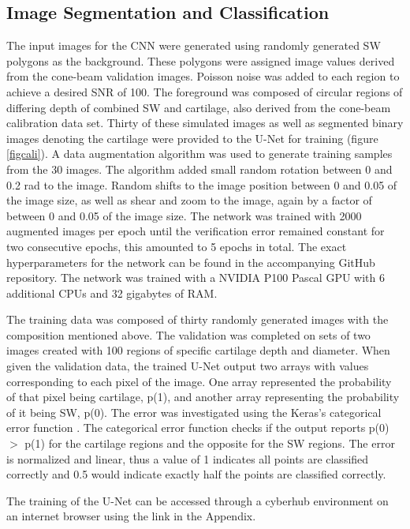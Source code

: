 \documentclass[a4paper,11pt]{article}
\begin{document}
\subsection{Image Segmentation and Classification}


The input images for the CNN were generated using randomly generated SW polygons as the background. These polygons were assigned image values derived from the cone-beam validation images. Poisson noise was added to each region to achieve a desired SNR of 100. The foreground was composed of circular regions of differing depth of combined SW and cartilage, also derived from the cone-beam calibration data set. Thirty of these simulated images as well as segmented binary images denoting the cartilage were provided to the U-Net for training (figure \ref{figcali}). A data augmentation algorithm was used to generate training samples from the 30 images. The algorithm added small random rotation between 0 and 0.2 rad to the image. Random shifts to the image position between 0 and 0.05 of the image size, as well as shear and zoom to the image, again by a factor of between 0 and 0.05 of the image size. The network was trained with 2000 augmented images per epoch until the verification error remained constant for two consecutive epochs, this amounted to 5 epochs in total. The exact hyperparameters for the network can be found in the accompanying GitHub repository. The network was trained with a NVIDIA P100 Pascal GPU \cite{Lindholm2008NVIDIAArchitecture} with 6 additional CPUs and 32 gigabytes of RAM.

The training data was composed of thirty randomly generated images with the composition mentioned above. The validation was completed on sets of two images created with 100 regions of specific cartilage depth and diameter.  When given the validation data, the trained U-Net output two arrays with values corresponding to each pixel of the image. One array represented the probability of that pixel being cartilage, p(1), and another array representing the probability of it being SW, p(0). The error was investigated using the Keras's categorical error function \cite{Keras-team/keras:Humans}. The categorical error function checks if the output reports p(0) $>$ p(1) for the cartilage regions and the opposite for the SW regions. The error is normalized and linear, thus a value of 1 indicates all points are classified correctly and 0.5 would indicate exactly half the points are classified correctly. 

The training of the U-Net can be accessed through a cyberhub environment \cite{Herwig2018Cyberhubs:Astronomy} on an internet browser using the link in the Appendix.
\end{document}
